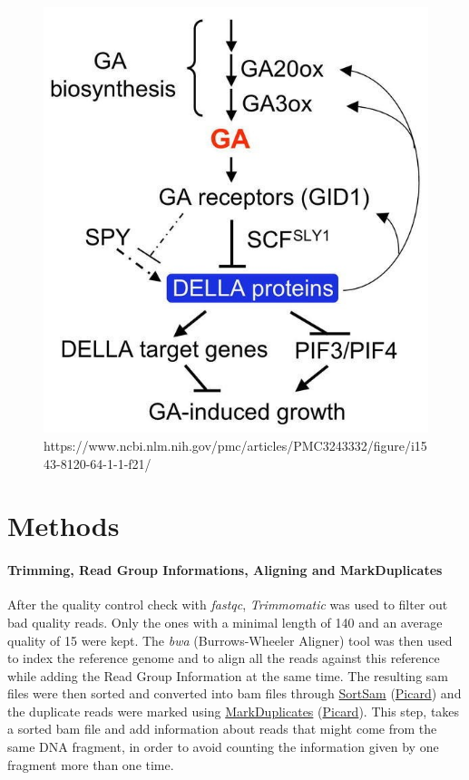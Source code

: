 \documentclass[10pt,a4paper]{article}
\begin{document}
\begin{figure}[H]
	\centering
	\includegraphics[width=0.4\linewidth]{img/GASPYpathway}
	\caption[GAI and SPY pathways]{https://www.ncbi.nlm.nih.gov/pmc/articles/PMC3243332/figure/i1543-8120-64-1-1-f21/}
	\label{fig:gaspypathway}
\end{figure}


\section*{\large Methods} 

\paragraph{Trimming, Read Group Informations, Aligning and MarkDuplicates} After the quality control check with \textit{fastqc}\cite{andrews2012}, \textit{Trimmomatic}\cite{bolger_trimmomatic:_2014} was used to filter out bad quality reads. Only the ones with a minimal length of 140 and an average quality of 15 were kept. The \textit{bwa} (Burrows-Wheeler Aligner) tool was then used to index the reference genome
and to align all the reads against this reference while adding the Read Group Information at the same time. The resulting sam files were then sorted and converted into bam files through  \href{https://software.broadinstitute.org/gatk/documentation/tooldocs/4.0.8.0/picard_sam_SortSam.php}{SortSam} (\href{https://broadinstitute.github.io/picard/}{Picard}) and the duplicate reads were marked using  \href{https://software.broadinstitute.org/gatk/documentation/tooldocs/4.0.4.0/picard_sam_markduplicates_MarkDuplicates.php}{MarkDuplicates} (\href{https://broadinstitute.github.io/picard/}{Picard}). This step, takes a sorted bam file and  add information about reads that might come from the same DNA fragment, in order to avoid counting the information given by one fragment more than one time. 
\end{document}
